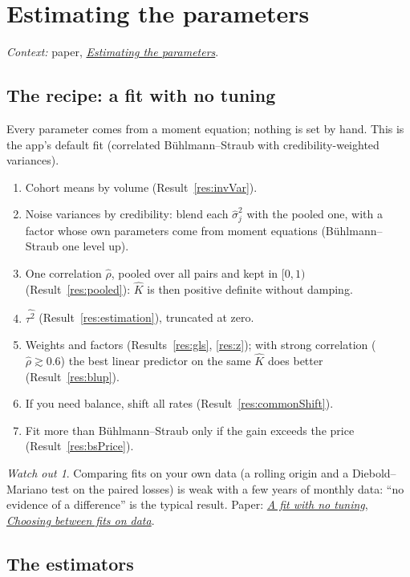 \documentclass[11pt]{article}
\theoremstyle{remark}
\newtheorem*{caveat}{Watch out}
\newcommand{\paper}[1]{%
  \href{https://mikaelandblom-coder.github.io/credible-lean/paper.pdf}{\emph{#1}}}
\begin{document}
\section{Estimating the parameters}\label{sec:estimation}

\noindent\textit{Context:} paper, \paper{Estimating the parameters}.

\subsection*{The recipe: a fit with no tuning}\label{sec:recipe}

Every parameter comes from a moment equation; nothing is set by hand. This is the app's
default fit (correlated Bühlmann--Straub with credibility-weighted variances).
\begin{enumerate}
  \item Cohort means by volume (Result~\ref{res:invVar}).
  \item Noise variances by credibility: blend each $\hat\sigma_j^2$ with the pooled one, with a
    factor whose own parameters come from moment equations (Bühlmann--Straub one level up).
  \item One correlation $\hat\rho$, pooled over all pairs and kept in $[0, 1)$
    (Result~\ref{res:pooled}): $\hat K$ is then positive definite without damping.
  \item $\widehat{\tau^2}$ (Result~\ref{res:estimation}), truncated at zero.
  \item Weights and factors (Results~\ref{res:gls}, \ref{res:z}); with strong correlation
    ($\hat\rho \gtrsim 0.6$) the best linear predictor on the same $\hat K$ does better
    (Result~\ref{res:blup}).
  \item If you need balance, shift all rates (Result~\ref{res:commonShift}).
  \item Fit more than Bühlmann--Straub only if the gain exceeds the price
    (Result~\ref{res:bsPrice}).
\end{enumerate}
\begin{caveat}
  Comparing fits on your own data (a rolling origin and a Diebold--Mariano test on the
  paired losses) is weak with a few years of monthly data: ``no evidence of a difference'' is
  the typical result. Paper: \paper{A fit with no tuning}, \paper{Choosing between fits on data}.
\end{caveat}

\subsection*{The estimators}
\end{document}
